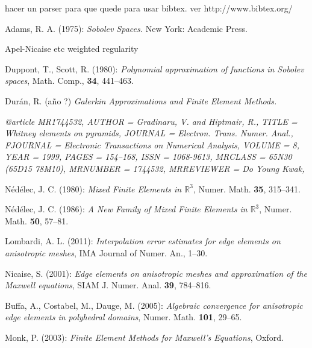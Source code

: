 \begin{thebibliography}{9}
 {\color{red} hacer un parser para que quede para usar bibtex.
ver http://www.bibtex.org/}

Adams, R. A. (1975): \emph{Sobolev Spaces.} New York: Academic Press.

Apel-Nicaise etc weighted regularity 

Duppont, T., Scott, R. (1980): \emph{Polynomial approximation of functions in Sobolev spaces},
Math. Comp., \textbf{34}, 441--463.

Dur\'an, R. (a\~no ?) \emph{Galerkin Approximations and Finite Element Methods.}

\emph{
@article {MR1744532,
    AUTHOR = {Gradinaru, V. and Hiptmair, R.},
     TITLE = {Whitney elements on pyramids},
   JOURNAL = {Electron. Trans. Numer. Anal.},
  FJOURNAL = {Electronic Transactions on Numerical Analysis},
    VOLUME = {8},
      YEAR = {1999},
     PAGES = {154--168},
      ISSN = {1068-9613},
   MRCLASS = {65N30 (65D15 78M10)},
  MRNUMBER = {1744532},
MRREVIEWER = {Do Young Kwak},
}}


N\'ed\'elec, J. C. (1980): \emph{Mixed Finite Elements in $\mathbb{R}^3$}, Numer. Math. \textbf{35},
315--341.

N\'ed\'elec, J. C. (1986): \emph{A New Family of Mixed Finite Elements in $\mathbb{R}^3$}, Numer. Math. 
\textbf{50}, 57--81.

Lombardi, A. L. (2011): \emph{Interpolation error estimates for edge elements on anisotropic meshes}, 
IMA Journal of Numer. An., 1--30.

Nicaise, S. (2001): \emph{Edge elements on anisotropic meshes and approximation of the Maxwell equations},
SIAM J. Numer. Anal. \textbf{39}, 784--816.

Buffa, A., Costabel, M., Dauge, M. (2005): \emph{Algebraic convergence for anisotro\-pic edge elements
in polyhedral domains}, Numer. Math. \textbf{101}, 29--65.

Monk, P. (2003): \emph{Finite Element Methods for Maxwell's Equations}, Oxford.
\end{thebibliography}